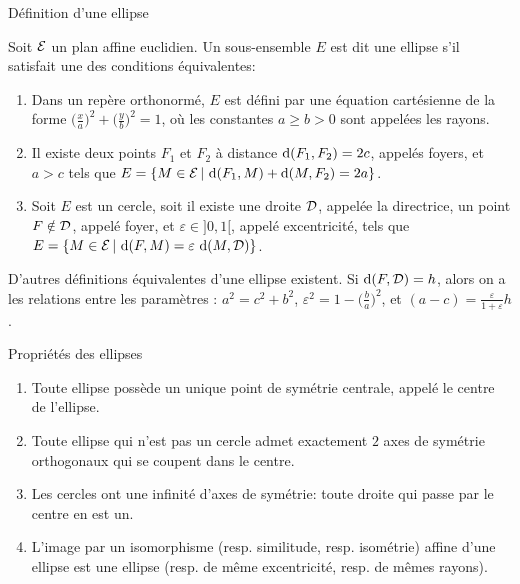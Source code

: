 \documentclass[11pt]{m53beamer}
\begin{document}
\begin{frame}{Définition d'une ellipse}
  \begin{defprop}
    Soit $\mathcal{E}$ un plan affine euclidien. Un sous-ensemble $E$ est dit une \alert{ellipse} s'il satisfait une des conditions équivalentes:
    \begin{enumerate}[<+(1)->]
      \item Dans un repère orthonormé, $E$ est défini par une équation cartésienne de la forme $\big(\frac{x}{a}\big)^{2}+\big(\frac{y}{b}\big)^{2}=1$, où les constantes $a \geq b > 0$ sont appelées \alert{les rayons}.
      \item Il existe deux points $F_{1}$ et $F_{2}$ à distance $\operatorname{d}(F_{1},F_{2})=2c$, appelés \alert{foyers},  et $a > c$ tels que $E = \{ M \in \mathcal{E} \,|\, \operatorname{d}(F_{1},M)+\operatorname{d}(M,F_{2})=2a\}$.
      \item Soit $E$ est un cercle, soit il existe une droite $\mathcal{D}$, appelée \alert{la directrice}, un point $F \notin \mathcal{D}$, appelé \alert{foyer}, et $\varepsilon \in ]0,1[$, appelé \alert{excentricité}, tels que $E = \{ M \in \mathcal{E} \,|\, \operatorname{d}(F,M)=\varepsilon\,\operatorname{d}(M,\mathcal{D})\}$.
    \end{enumerate}
  \end{defprop}\pause
  D'autres définitions équivalentes d'une ellipse existent.\pause{}\newline
  Si $\operatorname{d}(F,\mathcal{D})=h$, alors on a les relations entre les paramètres : $a^{2}=c^{2}+b^{2}$, $\varepsilon^{2} =1-\big(\frac{b}{a}\big)^{2}$, et $(a-c)=\frac{\varepsilon}{1+\varepsilon}h$.
\end{frame}
\begin{frame}{Propriétés des ellipses}
  \begin{enumerate}[<+(1)->]
    \item Toute ellipse possède un unique point de symétrie centrale, appelé \alert{le centre} de l'ellipse.
    \item Toute ellipse qui n'est pas un cercle admet exactement $2$ axes de symétrie orthogonaux qui se coupent dans le centre.
    \item Les cercles ont une infinité d'axes de symétrie: toute droite qui passe par le centre en est un.
    \item L'image par un isomorphisme (resp. similitude, resp. isométrie) affine d'une ellipse est une ellipse (resp. de même excentricité, resp. de mêmes rayons).
  \end{enumerate}
\end{frame}
\end{document}
